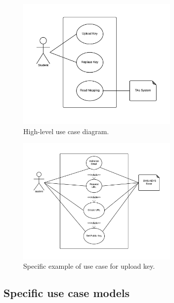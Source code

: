 \documentclass[11pt,a4paper]{report}
\begin{document}
\begin{figure}[H]
\centering
\includegraphics[width=0.7\textwidth]{pictures/use_case_pksu_del2_b_high}
\caption{High-level use case diagram.}
\label{fig:use_case_diagram_high_level}
\end{figure}



\begin{figure}[H]
\centering
\includegraphics[width=0.7\textwidth]{pictures/use_case_pksu_del2_b_example}
\caption{Specific example of use case for upload key.}
\label{fig:use_case_diagram_example}
\end{figure}

\subsection{Specific use case models}
\end{document}
